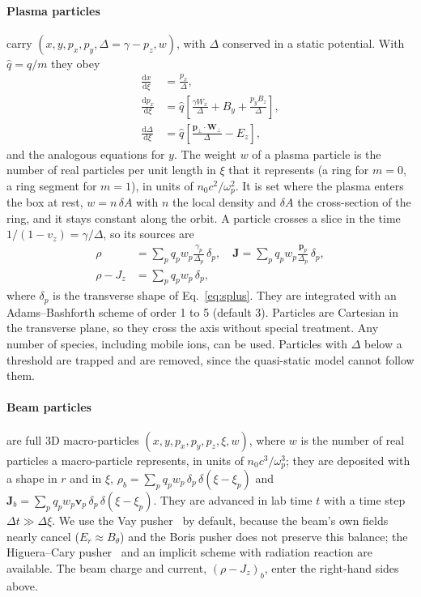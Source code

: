 \documentclass[aps,prab,reprint,floatfix,superscriptaddress,amsmath,amssymb]{revtex4-2}
\newcommand{\dd}{\mathrm{d}}
\begin{document}
\paragraph{Plasma particles} carry $(x, y, p_x, p_y, \Delta = \gamma - p_z, w)$, with $\Delta$ conserved in a static potential. With $\hat q = q/m$ they obey
\begin{align}
\frac{\dd x}{\dd\xi} &= \frac{p_x}{\Delta}, \label{eq:eom}\\
\frac{\dd p_x}{\dd\xi} &= \hat q\left[\frac{\gamma W_x}{\Delta} + B_y + \frac{p_y B_z}{\Delta}\right], \\
\frac{\dd \Delta}{\dd\xi} &= \hat q\left[\frac{\bm{p}_\perp\cdot\bm{W}_\perp}{\Delta} - E_z\right], \label{eq:ddelta}
\end{align}
and the analogous equations for $y$. The weight $w$ of a plasma particle is the number of real particles per unit length in $\xi$ that it represents (a ring for $m=0$, a ring segment for $m=1$), in units of $n_0 c^2/\omega_p^2$. It is set where the plasma enters the box at rest, $w = n\,\delta A$ with $n$ the local density and $\delta A$ the cross-section of the ring, and it stays constant along the orbit. A particle crosses a slice in the time $1/(1-v_z) = \gamma/\Delta$, so its sources are
\begin{align}
\rho &= \sum_p q_p w_p \frac{\gamma_p}{\Delta_p}\,\delta_p, \quad
\bm{J} = \sum_p q_p w_p \frac{\bm{p}_p}{\Delta_p}\,\delta_p, \nonumber\\
\rho - J_z &= \sum_p q_p w_p\, \delta_p,
\label{eq:plsources}
\end{align}
where $\delta_p$ is the transverse shape of Eq.~\eqref{eq:splus}. They are integrated with an Adams--Bashforth scheme of order 1 to 5 (default 3). Particles are Cartesian in the transverse plane, so they cross the axis without special treatment. Any number of species, including mobile ions, can be used. Particles with $\Delta$ below a threshold are trapped and are removed, since the quasi-static model cannot follow them.

\paragraph{Beam particles} are full 3D macro-particles $(x, y, p_x, p_y, p_z, \xi, w)$, where $w$ is the number of real particles a macro-particle represents, in units of $n_0 c^3/\omega_p^3$; they are deposited with a shape in $r$ and in $\xi$, $\rho_b = \sum_p q_p w_p\, \delta_p\,\delta(\xi - \xi_p)$ and $\bm{J}_b = \sum_p q_p w_p \bm{v}_p\, \delta_p\,\delta(\xi - \xi_p)$. They are advanced in lab time $t$ with a time step $\Delta t \gg \Delta\xi$. We use the Vay pusher~\cite{Vay2008} by default, because the beam's own fields nearly cancel ($E_r\approx B_\theta$) and the Boris pusher does not preserve this balance; the Higuera--Cary pusher~\cite{Higuera2017} and an implicit scheme with radiation reaction are available. The beam charge and current, $(\rho - J_z)_b$, enter the right-hand sides above.
\end{document}

